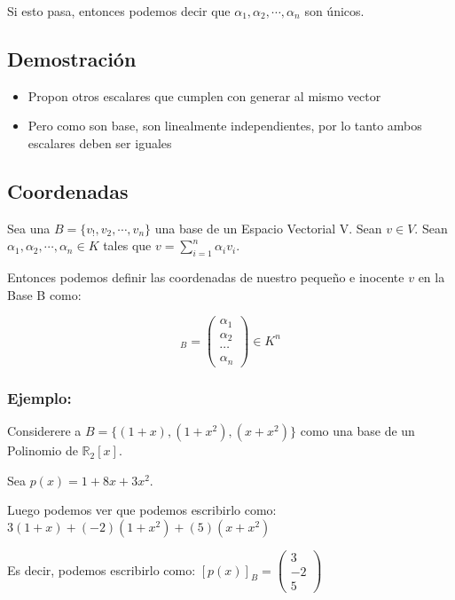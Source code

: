 \documentclass[12pt]{article}							    %
\begin{document}
Si esto pasa, entonces podemos decir que  $\alpha_1, \alpha_2, \cdots, \alpha_n$ son únicos.

\subsection{Demostración}
\begin{itemize}
    \item Propon otros escalares que cumplen con generar al mismo vector
    \item Pero como son base, son linealmente independientes, por lo tanto ambos escalares deben ser iguales
\end{itemize}


\subsection{Coordenadas}
Sea una $B = \{ v_!, v_2, \cdots, v_n\}$ una base de un Espacio Vectorial V.
Sean $v \in V$.
Sean $\alpha_1, \alpha_2, \cdots, \alpha_n \in K$ tales que $v = \sum_{i=1}^{n} \alpha_i v_i$.

Entonces podemos definir las coordenadas de nuestro pequeño e inocente $v$ en la Base B como:

\begin{equation}
    [v]_B = 
    \begin{pmatrix} 
        \alpha_1    \\
        \alpha_2    \\
        \cdots      \\
        \alpha_n 
    \end{pmatrix}
    \in K^n
\end{equation}


\clearpage

\subsubsection{Ejemplo:}
Considerere a $B = \{ (1+x), (1+x^2) , (x + x^2) \}$ como una base de un Polinomio de $\mathbb{R}_2[x]$.

Sea $p(x) = 1+8x+3x^2$.

Luego podemos ver que podemos escribirlo como:
$3(1+x) + (-2)(1+x^2) + (5)(x+x^2)$

Es decir, podemos escribirlo como:
$[p(x)]_B =  \begin{pmatrix} 3\\-2\\5\end{pmatrix}$
 
\end{document}
